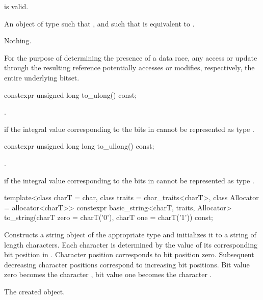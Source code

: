 \begin{itemdescr}
\pnum
\expects
{} is valid.

\pnum
\returns
An object of type
such that
,
and such that
is equivalent to
.

\pnum
\throws
Nothing.

\pnum
\remarks
For the purpose of determining the presence of a data
race, any access or update through the resulting
reference potentially accesses or modifies, respectively, the entire
underlying bitset.
\end{itemdescr}

%
\begin{itemdecl}
constexpr unsigned long to_ulong() const;
\end{itemdecl}

\begin{itemdescr}
\pnum
\returns
{}.

\pnum
\throws
{}%
 if the integral value 
corresponding to the bits in 
cannot be represented as type .
\end{itemdescr}

%
\begin{itemdecl}
constexpr unsigned long long to_ullong() const;
\end{itemdecl}

\begin{itemdescr}
\pnum
\returns
{}.

\pnum
\throws
{}%
 if the integral value 
corresponding to the bits in 
cannot be represented as type .
\end{itemdescr}

%
\begin{itemdecl}
template<class charT = char,
         class traits = char_traits<charT>,
         class Allocator = allocator<charT>>
  constexpr basic_string<charT, traits, Allocator>
    to_string(charT zero = charT('0'), charT one = charT('1')) const;
\end{itemdecl}

\begin{itemdescr}
\pnum
\effects
Constructs a string object of the appropriate type
and initializes it to a string of length  characters.
Each character is determined by the value of its corresponding bit position in
.
Character position  corresponds to bit position zero.
Subsequent decreasing character positions correspond to increasing bit
positions.
Bit value zero becomes the character ,
bit value one becomes the character
.

\pnum
\returns
The created object.
\end{itemdescr}

